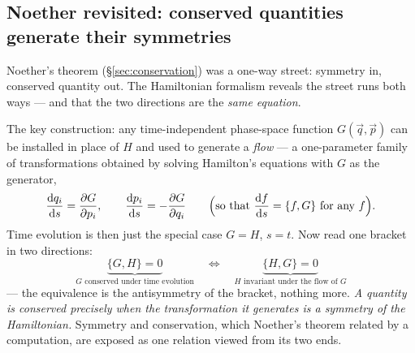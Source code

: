 \documentclass[11pt]{article}
\theoremstyle{plain}
\theoremstyle{definition}
\theoremstyle{remark}
\newcommand{\dd}{\mathrm{d}}
\newcommand{\pd}[2]{\frac{\partial #1}{\partial #2}}
\newcommand{\vq}{\vec{q}}
\newcommand{\vp}{\vec{p}}
\begin{document}
\subsection{Noether revisited: conserved quantities generate their symmetries}
\label{sec:noether-hamiltonian}

Noether's theorem (\S\ref{sec:conservation}) was a one-way street:
symmetry in, conserved quantity out. The Hamiltonian formalism reveals
the street runs both ways --- and that the two directions are the
\emph{same equation}.

The key construction: any time-independent phase-space function
$G(\vq,\vp)$ can be installed in place of $H$ and used to generate a
\emph{flow} --- a one-parameter family of transformations obtained by
solving Hamilton's equations with $G$ as the generator,
\begin{equation}
  \frac{\dd q_i}{\dd s} = \pd{G}{p_i},
  \qquad
  \frac{\dd p_i}{\dd s} = -\pd{G}{q_i}
  \qquad
  \Bigl(\text{so that } \frac{\dd f}{\dd s} = \{f, G\}
  \text{ for any } f\Bigr).
\end{equation}
Time evolution is then just the special case $G = H$, $s = t$. Now read
one bracket in two directions:
\begin{equation}
  \boxed{\;
  \underbrace{\{G, H\} = 0}_{\text{$G$ conserved under time evolution}}
  \quad\Longleftrightarrow\quad
  \underbrace{\{H, G\} = 0}_{\text{$H$ invariant under the flow of $G$}}
  \;}
\end{equation}
--- the equivalence is the antisymmetry of the bracket, nothing more.
\emph{A quantity is conserved precisely when the transformation it
generates is a symmetry of the Hamiltonian.} Symmetry and conservation,
which Noether's theorem related by a computation, are exposed as one
relation viewed from its two ends.
\end{document}
